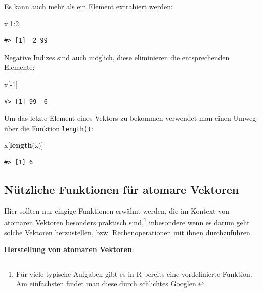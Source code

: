 \documentclass[]{tufte-book}
\newenvironment{Shaded}{}{}
\newcommand{\KeywordTok}[1]{\textcolor[rgb]{0.00,0.44,0.13}{\textbf{#1}}}
\newcommand{\DecValTok}[1]{\textcolor[rgb]{0.25,0.63,0.44}{#1}}
\newcommand{\OperatorTok}[1]{\textcolor[rgb]{0.40,0.40,0.40}{#1}}
\newcommand{\NormalTok}[1]{#1}
\begin{document}
Es kann auch mehr als ein Element extrahiert werden:

\begin{Shaded}
\begin{Highlighting}[]
\NormalTok{x[}\DecValTok{1}\OperatorTok{:}\DecValTok{2}\NormalTok{]}
\end{Highlighting}
\end{Shaded}

\begin{verbatim}
#> [1]  2 99
\end{verbatim}

Negative Indizes sind auch möglich, diese eliminieren die entsprechenden
Elemente:

\begin{Shaded}
\begin{Highlighting}[]
\NormalTok{x[}\OperatorTok{-}\DecValTok{1}\NormalTok{]}
\end{Highlighting}
\end{Shaded}

\begin{verbatim}
#> [1] 99  6
\end{verbatim}

Um das letzte Element eines Vektors zu bekommen verwendet man einen
Umweg über die Funktion \texttt{length()}:

\begin{Shaded}
\begin{Highlighting}[]
\NormalTok{x[}\KeywordTok{length}\NormalTok{(x)]}
\end{Highlighting}
\end{Shaded}

\begin{verbatim}
#> [1] 6
\end{verbatim}

\subsection{Nützliche Funktionen für atomare
Vektoren}\label{nutzliche-funktionen-fur-atomare-vektoren}

Hier sollten nur eingige Funktionen erwähnt werden, die im Kontext von
atomaren Vektoren besonders praktisch sind,\footnote{Für viele typische
  Aufgaben gibt es in R bereits eine vordefinierte Funktion. Am
  einfachsten findet man diese durch schlichtes Googlen.} inbesondere
wenn es darum geht solche Vektoren herzustellen, bzw. Rechenoperationen
mit ihnen durchzuführen.

\textbf{Herstellung von atomaren Vektoren}:
\end{document}
